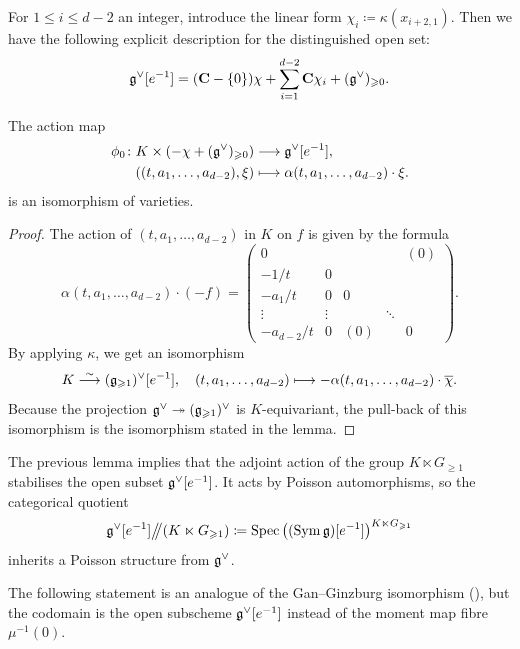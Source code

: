 For $1 \leqslant i \leqslant d - 2$ an integer, introduce the linear form $\chi_i \coloneqq \kappa(x_{i+2, 1})$. Then we have the following explicit description for the distinguished open set:
\[ \mathfrak g^\vee[e^{-1}] = (\mathbf{C} - \{0\}) \chi + \sum_{i=1}^{d-2} \mathbf{C} \chi_i + (\mathfrak g^\vee)_{\geqslant 0}. \]

\begin{lemma} \label{lemma:dilation-isomorphism}
	The action map
	\[ \begin{split}	
		\phi_0 \colon K \times (- \chi + (\mathfrak g^\vee)_{\geqslant 0}) & \longrightarrow  \mathfrak g^\vee[e^{-1}], \\
		((t, a_1, \dots, a_{d-2}), \xi) & \longmapsto  \alpha(t, a_1, \dots, a_{d-2}) \cdot \xi. 
	\end{split} \]
	is an isomorphism of varieties.
\end{lemma}

\begin{proof}
	The action of $(t, a_1, \dots, a_{d-2})$ in $K$ on $f$ is given by the formula
	\[ \alpha(t, a_1, \dots, a_{d-2}) \cdot (-f) = \left(\begin{smallmatrix}
		0 & & & & (0) \\
		-1/t & 0 & &  & \\
		-a_1 / t & 0 & 0  & & \\
		\vdots & \vdots & & \ddots &  \\
		-a_{d-2} / t & 0 & (0) & & 0
	\end{smallmatrix}\right). \]
	By applying $\kappa$, we get an isomorphism
	\[ K \overset{\sim}{\longrightarrow} (\mathfrak g_{\geqslant 1})^\vee[e^{-1}], \quad (t, a_1, \dots, a_{d-2}) \longmapsto - \alpha(t, a_1, \dots, a_{d-2}) \cdot \overline{\chi}. \]
	Because the projection $\mathfrak g^\vee \twoheadrightarrow (\mathfrak g_{\geqslant 1})^\vee$ is $K$-equivariant, the pull-back of this isomorphism is the isomorphism stated in the lemma.
\end{proof}

The previous lemma implies that the adjoint action of the group $K \ltimes G_{\geqslant 1}$ stabilises the open subset $\mathfrak g^\vee[e^{-1}]$. It acts by Poisson automorphisms, so the categorical quotient
\[ \mathfrak g^\vee[e^{-1}] \big/\!\!\big/ (K \ltimes G_{\geqslant 1}) \coloneq \operatorname{Spec} \big((\operatorname{Sym} \mathfrak g)[e^{-1}]\big)^{K \ltimes G_{\geqslant 1}} \] 
inherits a Poisson structure from $\mathfrak g^\vee$.

The following statement is an analogue of the Gan--Ginzburg isomorphism (), but the codomain is the open subscheme $\mathfrak g^\vee[e^{-1}]$ instead of the moment map fibre $\mu^{-1}(0)$.

